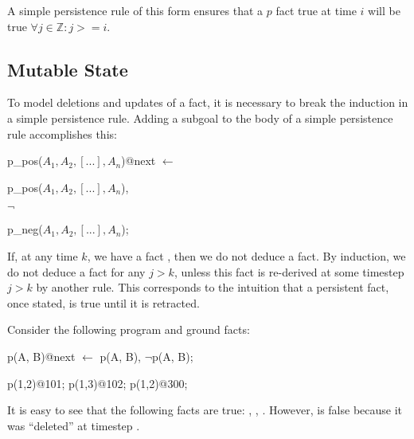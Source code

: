 
\noindent
A simple persistence rule of this form
ensures that a $p$ fact true at time $i$ will be true $\forall j \in \mathbb{Z} : j >= i$.



\subsection{Mutable State}
\label{sec:mutable}

To model deletions and updates of a fact, it is necessary to break the induction
in a simple persistence rule.  Adding a  subgoal to the body of a
simple persistence rule accomplishes this:


\begin{dedalus}
p\_pos($A_1,A_2,[...],A_n$)@next $\leftarrow$
\end{dedalus}

\hspace{5mm}
\begin{dedalus}
p\_pos($A_1,A_2,[...],A_n$),
\end{dedalus}

\hspace{5mm}
$\lnot$
\begin{dedalus}
p\_neg($A_1,A_2,[...],A_n$);
\end{dedalus}

%
%
\noindent
If, at any time $k$, we have a fact
, then we do not deduce a
 fact.  By induction, we do not
deduce a  fact for any $j > k$, unless
this  fact is re-derived at some timestep $j > k$ by another
rule.  This corresponds to the intuition that a persistent fact, once stated,
is true until it is retracted.  

\begin{example}
Consider the following \slang program and ground facts:

\begin{Dedalus}
p\pos(A, B)@next \(\leftarrow\) p\pos(A, B), \(\lnot\)p\nega(A, B);

p(1,2)@101;
p(1,3)@102;
p\nega(1,2)@300;
\end{Dedalus}

It is easy to see that the following facts are true: ,
, .  However,  is
false because it was ``deleted'' at timestep .
\end{example}

